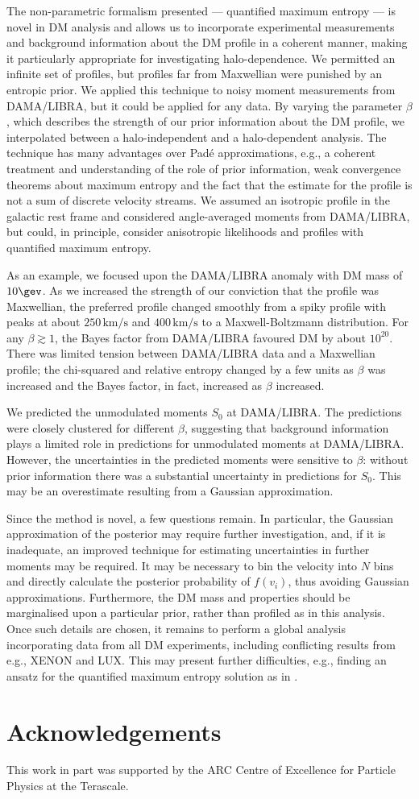 \documentclass{article}
\begin{document}
The non-parametric formalism presented --- quantified maximum entropy --- is novel in DM analysis and allows us to incorporate experimental measurements and background information about the DM profile in a coherent manner, making it particularly appropriate for investigating halo-dependence. We permitted an infinite set of profiles, but profiles far from Maxwellian were punished by an entropic prior. We applied this technique to noisy moment measurements from DAMA/LIBRA, but it could be applied for any data. By varying the parameter $\beta$, which describes the strength of our prior information about the DM profile, we interpolated between a halo-independent and a halo-dependent analysis. The technique has many advantages over Pad\'e approximations, e.g., a coherent treatment and understanding of the role of prior information, weak convergence theorems about maximum entropy and the fact that the estimate for the profile is not a sum of discrete velocity streams. We assumed an isotropic profile in the galactic rest frame and considered angle-averaged moments from DAMA/LIBRA, but could, in principle, consider anisotropic likelihoods and profiles with quantified maximum entropy.

As an example, we focused upon the DAMA/LIBRA anomaly with DM mass of $10\gev$. As we increased the strength of our conviction that the profile was Maxwellian, the preferred profile changed smoothly from a spiky profile with peaks at about $250\,\text{km/s}$ and $400\,\text{km/s}$ to a Maxwell-Boltzmann distribution. For any $\beta \gtrsim 1$, the Bayes factor from DAMA/LIBRA favoured DM by about $10^{20}$. There was limited tension between DAMA/LIBRA data and a Maxwellian profile; the chi-squared and relative entropy changed by a few units as $\beta$ was increased and the Bayes factor, in fact, increased as $\beta$ increased.

We predicted the unmodulated moments $S_0$ at DAMA/LIBRA. The predictions were closely clustered for different $\beta$, suggesting that background information plays a limited role in predictions for unmodulated moments at DAMA/LIBRA. However, the uncertainties in the predicted moments were sensitive to $\beta$: without prior information there was a substantial uncertainty in predictions for $S_0$. This may be an overestimate resulting from a Gaussian approximation. 

Since the method is novel, a few questions remain. In particular, the Gaussian approximation of the posterior may require further investigation, and, if it is inadequate, an improved technique for estimating uncertainties in further moments may be required. It may be necessary to bin the velocity into $N$ bins and directly calculate the posterior probability of $f(v_i)$, thus avoiding Gaussian approximations. Furthermore, the DM mass and properties should be marginalised upon a particular prior, rather than profiled as in this analysis. Once such details are chosen, it remains to perform a global analysis incorporating data from all DM experiments, including conflicting results from e.g., XENON and LUX. This may present further difficulties, e.g., finding an ansatz for the quantified maximum entropy solution as in .

\section*{Acknowledgements}

This work in part was supported by the ARC Centre of Excellence for Particle Physics at the Terascale.
\end{document}
